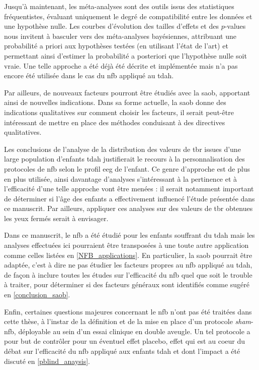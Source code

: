Jusqu'à maintenant, les méta-analyses sont des outils issus des statistiques fréquentistes,
évaluant uniquement le degré de compatibilité entre les données et une hypothèse nulle.
Les courbes d'évolution des tailles d'effets et des $p$-values nous invitent à basculer vers des méta-analyses bayésiennes,
attribuant une probabilité a priori aux hypothèses testées (en utilisant l'état de l'art) et permettant ainsi d'estimer la probabilité a posteriori que l'hypothèse nulle soit vraie.
Une telle approche a été déjà été décrite et implémentée \citep{Dormuth2016, Spiegelhalter2004} mais n'a pas encore été utilisée dans le cas du \gls{nfb} appliqué au \gls{tdah}.  

Par ailleurs, de nouveaux facteurs pourront être étudiés avec la \gls{saob}, apportant ainsi de nouvelles  
indications. Dans sa forme actuelle, la \gls{saob} donne des indications qualitatives sur comment choisir les facteurs, il serait peut-être intéressant de mettre en place des
méthodes conduisant à des directives qualitatives.

Les conclusions de l'analyse de la distribution des valeurs de \gls{tbr} issues d'une large population d'enfants \gls{tdah} justifierait le recours à la 
personnalisation des protocoles de \gls{nfb} selon le profil \gls{eeg} de l'enfant. Ce genre d'approche est de plus en plus utilisée, ainsi davantage d'analyses s'intéressant
à la pertinence et à l'efficacité d'une telle approche vont être menées : il serait notamment important de déterminer si l'âge des enfants a effectivement influencé l'étude
présentée dans ce manuscrit. Par ailleurs, appliquer ces analyses sur des valeurs de \gls{tbr} obtenues les yeux fermés serait à envisager. 

Dans ce manuscrit, le \gls{nfb} a été étudié pour les enfants souffrant du \gls{tdah} mais les analyses effectuées ici pourraient être 
transposées à une toute autre application comme celles listées en \ref{NFB_applications}.
En particulier, la \gls{saob} pourrait être adaptée, c'est à dire ne pas étudier les facteurs propres au \gls{nfb} 
appliqué au \gls{tdah}, de façon à inclure toutes les études sur l'efficacité du \gls{nfb} 
quel que soit le trouble à traiter, pour déterminer si des facteurs généraux sont identifiés comme sugéré en \ref{conclusion_saob}. 

Enfin, certaines questions majeures concernant le \gls{nfb} n'ont pas été traitées dans cette thèse,
à l'instar de la définition et de la mise en place d'un protocole \textit{sham}-\gls{nfb}, déployable au sein d'un essai clinique en double aveugle. Un tel protocole 
a pour but de contrôler pour un éventuel effet placebo, effet qui est au coeur du débat sur l'efficacité du \gls{nfb} appliqué aux enfants \gls{tdah} et dont l'impact
a été discuté en \ref{pblind_anaysis}. 

